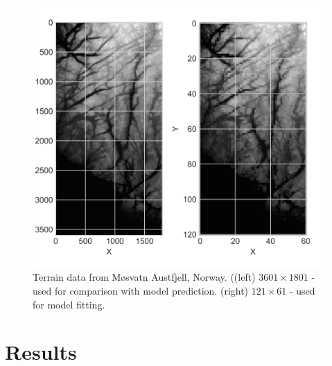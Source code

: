 \documentclass[%
oneside,                 %
final,                   %
10pt]{article}
\begin{document}
\begin{figure}[!h]
        \centering 
         \includegraphics[scale=0.5]{../Results/Part_g/terrain_full_reduced.png} 
        \caption{Terrain data from Møsvatn Austfjell, Norway. ((left) $3601 \times 1801$ - used for comparison with model prediction. (right) $121 \times 61$ - used for model fitting. }
        \label{fig:full_terrain}   
\end{figure}  

\section{Results}
\end{document}
